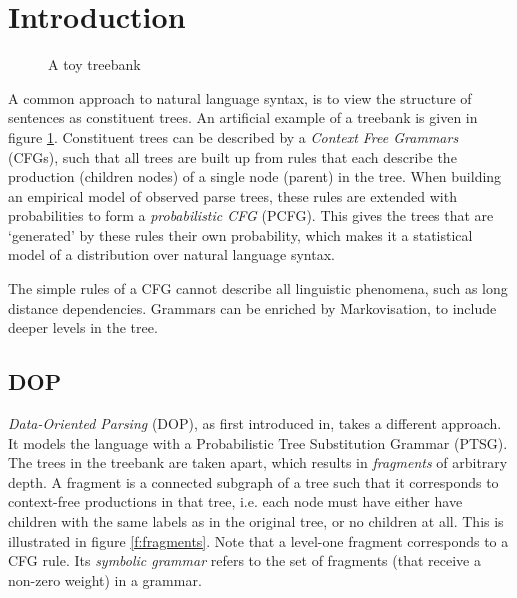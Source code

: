 
\section{Introduction}




\begin{figure}[h!]
\center 
\caption{A toy treebank} \label{f:treebank}
\end{figure}

A common approach to natural language syntax, is to view the structure of sentences as constituent trees. An artificial example of a treebank is given in figure \ref{f:treebank}. Constituent trees can be described by a \emph{Context Free Grammars} (CFGs),  such that all trees are built up from  rules that each describe the production (children nodes) of a single node (parent) in the tree. When building an empirical model of observed parse trees, these rules are extended with probabilities to form a \emph{probabilistic CFG} (PCFG). This gives the trees that are `generated' by these rules their own probability, which makes it a statistical model of a distribution over natural language syntax.

The simple rules of a CFG cannot describe all linguistic phenomena, such as long distance dependencies. Grammars can be enriched by Markovisation, to include deeper levels in the tree. 


\subsection{DOP}
\emph{Data-Oriented Parsing} (DOP), as first introduced in\cite{scha1990}, takes a different approach. It models the language with a Probabilistic Tree Substitution Grammar (PTSG). 
The trees in the treebank are taken apart, which results in \emph{fragments} of arbitrary depth. 
A fragment is a connected subgraph of a tree such that it corresponds to context-free productions in that tree, i.e. each node must have either have children with the same labels as in the original tree, or no children at all. This is illustrated in figure \ref{f:fragments}. Note that a level-one fragment corresponds to a CFG rule. Its \emph{symbolic grammar} refers to the set of fragments (that receive a non-zero weight) in a grammar. 



